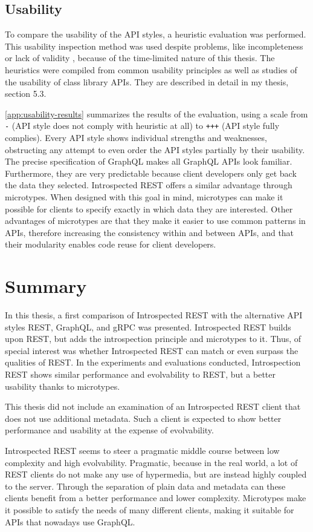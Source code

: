 \subsection{Usability}
To compare the usability of the API styles, a heuristic evaluation \autocite{Nielsen1990} was performed. This usability inspection method was used despite problems, like incompleteness or lack of validity \autocites{Kock2009}{Law2004}, because of the time-limited nature of this thesis. The heuristics were compiled from common usability principles as well as studies of the usability of class library APIs. They are described in detail in my thesis, section 5.3.

\cref{app:usability-results} summarizes the results of the evaluation, using a scale from \texttt{-} (API style does not comply with heuristic at all) to \texttt{+++} (API style fully complies). Every API style shows individual strengths and weaknesses, obstructing any attempt to even order the API styles partially by their usability. The precise specification of GraphQL makes all GraphQL APIs look familiar. Furthermore, they are very predictable because client developers only get back the data they selected. Introspected REST offers a similar advantage through microtypes. When designed with this goal in mind, microtypes can make it possible for clients to specify exactly in which data they are interested. Other advantages of microtypes are that they make it easier to use common patterns in APIs, therefore increasing the consistency within and between APIs, and that their modularity enables code reuse for client developers.

\section{Summary}\label{sec:summary}

In this thesis, a first comparison of Introspected REST with the alternative API styles REST, GraphQL, and gRPC was presented. Introspected REST builds upon REST, but adds the introspection principle and microtypes to it. Thus, of special interest was whether Introspected REST can match or even surpass the qualities of REST\@. In the experiments and evaluations conducted, Introspection REST shows similar performance and evolvability to REST, but a better usability thanks to microtypes.

This thesis did not include an examination of an Introspected REST client that does not use additional metadata. Such a client is expected to show better performance and usability at the expense of evolvability.

Introspected REST seems to steer a pragmatic middle course between low complexity and high evolvability. Pragmatic, because in the real world, a lot of REST clients do not make any use of hypermedia, but are instead highly coupled to the server. Through the separation of plain data and metadata can these clients benefit from a better performance and lower complexity. Microtypes make it possible to satisfy the needs of many different clients, making it suitable for APIs that nowadays use GraphQL\@.